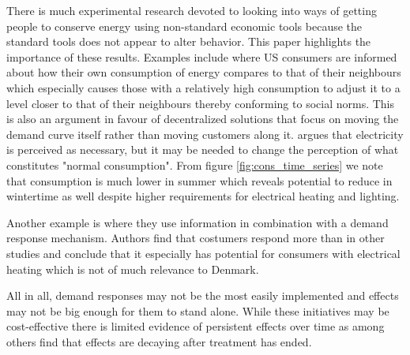 There is much experimental research devoted to looking into ways of getting people to conserve energy using non-standard economic tools because the standard tools does not appear to alter behavior. This paper highlights the importance of these results. Examples include \citet{allcott2011social} where US consumers are informed about how their own consumption of energy compares to that of their neighbours which especially causes those with a relatively high consumption to adjust it to a level closer to that of their neighbours thereby conforming to social norms. This is also an argument in favour of decentralized solutions that focus on moving the demand curve itself rather than moving customers along it. \citet{kirschen2003demand} argues that electricity is perceived as necessary, but it may be needed to change the perception of what constitutes "normal consumption". From figure \ref{fig:cons_time_series} we note that consumption is much lower in summer which reveals potential to reduce in wintertime as well despite higher requirements for electrical heating and lighting.
\par Another example is \citet{saele2011demand} where they use information in combination with a demand response mechanism. Authors find that costumers respond more than in other studies and conclude that it especially has potential for consumers with electrical heating which is not of much relevance to Denmark.\bigskip

All in all, demand responses may not be the most easily implemented and effects may not be big enough for them to stand alone. While these initiatives may be cost-effective there is limited evidence of persistent effects over time as \citet{allcott2014short} among others find that effects are decaying after treatment has ended.


